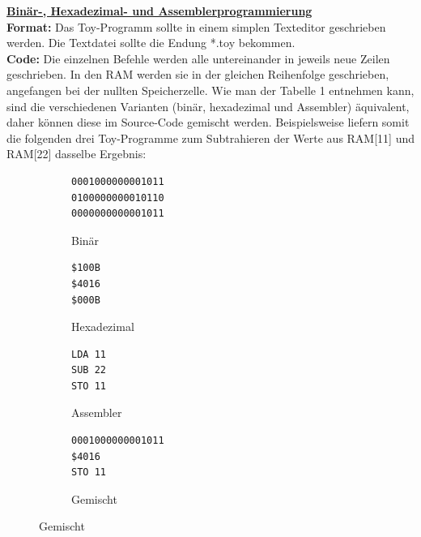 \documentclass{article}
\begin{document}
\noindent \large \underline{\textbf{Binär-, Hexadezimal- und Assemblerprogrammierung}}\\

\normalsize
\noindent \textbf{Format:} Das Toy-Programm sollte in einem simplen Texteditor geschrieben werden. Die Textdatei
sollte die Endung *.toy bekommen.\\

\noindent \textbf{Code:} Die einzelnen Befehle werden alle untereinander in jeweils neue Zeilen geschrieben.
In den RAM werden sie in der gleichen Reihenfolge geschrieben, angefangen bei
der nullten Speicherzelle.
Wie man der Tabelle 1 entnehmen kann, sind die verschiedenen Varianten (binär, hexadezimal und
Assembler) äquivalent, daher können diese im Source-Code gemischt werden. Beispielsweise
liefern somit die folgenden drei Toy-Programme zum Subtrahieren der Werte aus RAM[11] und RAM[22]
dasselbe Ergebnis:
\begin{figure}[h!]
    \centering
    \begin{subfigure}[b]{0.45\textwidth}
\begin{lstlisting}
0001000000001011
0100000000010110
0000000000001011
\end{lstlisting}
        \caption{Binär}
   \end{subfigure}
   \begin{subfigure}[b]{0.15\textwidth}
\begin{lstlisting}
$100B
$4016
$000B
\end{lstlisting}
        \caption{Hexadezimal}
    \end{subfigure}
    \begin{subfigure}[b]{0.15\textwidth}
\begin{lstlisting}
LDA 11
SUB 22
STO 11
\end{lstlisting}
        \caption{Assembler}
    \end{subfigure}
    \begin{subfigure}[b]{0.2\textwidth}
\begin{lstlisting}
0001000000001011
$4016
STO 11
\end{lstlisting}
        \caption{Gemischt}
    \end{subfigure}
\end{figure}
\end{document}
